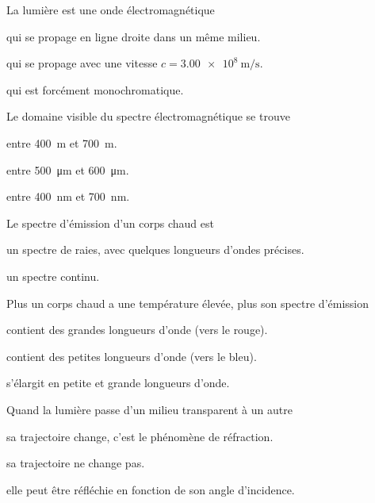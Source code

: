
\begin{qcm}{La lumière est une onde électromagnétique}
  \item\reponseQCM qui se propage en ligne droite dans un même milieu.
  \item\reponseQCM qui se propage avec une vitesse $c = \qty{3,00e8}{\m\per\s}$.
  \item qui est forcément monochromatique.
\end{qcm}
%
\begin{qcm}{Le domaine visible du spectre électromagnétique se trouve}
  \item entre \qty{400}{\m} et \qty{700}{\m}.
  \item entre \qty{500}{\micro\m} et \qty{600}{\micro\m}.
  \item\reponseQCM entre \qty{400}{\nano\m} et \qty{700}{\nano\m}.
\end{qcm}
%
\begin{qcm}{Le spectre d'émission d'un corps chaud est}
  \item un spectre de raies, avec quelques longueurs d'ondes précises.
  \item\reponseQCM un spectre continu.
\end{qcm}
%
\begin{qcm}{Plus un corps chaud a une température élevée, plus son spectre d'émission}
  \item contient des grandes longueurs d'onde (vers le rouge).
  \item\reponseQCM contient des petites longueurs d'onde (vers le bleu).
  \item s'élargit en petite et grande longueurs d'onde.
\end{qcm}
%
\begin{qcm}{Quand la lumière passe d'un milieu transparent à un autre}
  \item\reponseQCM sa trajectoire change, c'est le phénomène de réfraction.
  \item sa trajectoire ne change pas.
  \item\reponseQCM elle peut être réfléchie en fonction de son angle d'incidence.
\end{qcm}